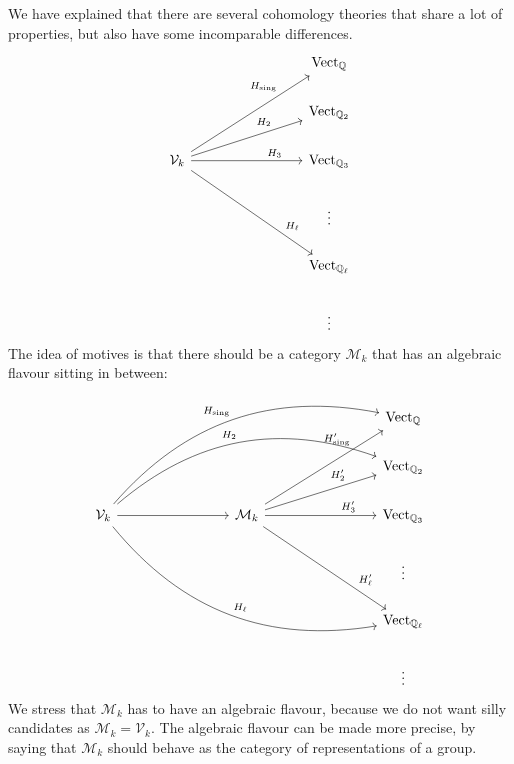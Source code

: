 \documentclass[a4paper,10pt]{article}
\begin{document}
We have explained that there are several cohomology theories that share a lot
of properties, but also have some incomparable differences.
\[
	\begin{tikzcd}[column sep=8em] %
		\null & \mathrm{Vect}_{\mathbb{Q}} \\
		& \mathrm{Vect}_{\mathbb{Q}_{2}} \\
		\mathcal{V}_{k}
		\ar{uur}[near end]{H_{\mathrm{sing}}}
		\ar{ur}[near end]{H_{2}}
		\ar{r}[near end]{H_{3}}
		\ar{ddr}[near end]{H_{\ell}}
		& \mathrm{Vect}_{\mathbb{Q}_{3}} \\
		& \vdots \\
		& \mathrm{Vect}_{\mathbb{Q}_{\ell}} \\
		& \vdots
	\end{tikzcd} %
\]
The idea of motives is that there should be a category $\mathcal{M}_{k}$ that
has an algebraic flavour sitting in between:
\[
	\begin{tikzcd}[column sep=8em] %
		\null && \mathrm{Vect}_{\mathbb{Q}} \\
		&& \mathrm{Vect}_{\mathbb{Q}_{2}} \\
		\mathcal{V}_{k} \rar{}
		\ar[bend left]{uurr}{H_{\mathrm{sing}}}
		\ar[bend left]{urr}{H_{2}}
		\ar[bend right]{ddrr}{H_{\ell}}
		& \mathcal{M}_{k}
		\ar{uur}[near end]{H'_{\mathrm{sing}}}
		\ar{ur}[near end]{H'_{2}}
		\ar{r}[near end]{H'_{3}}
		\ar{ddr}[near end]{H'_{\ell}}
		& \mathrm{Vect}_{\mathbb{Q}_{3}} \\
		&& \vdots \\
		&& \mathrm{Vect}_{\mathbb{Q}_{\ell}} \\
		&& \vdots
	\end{tikzcd} %
\]
We stress that $\mathcal{M}_{k}$ has to have an algebraic flavour, because we
do not want silly candidates as $\mathcal{M}_{k} = \mathcal{V}_{k}$. The
algebraic flavour can be made more precise, by saying that $\mathcal{M}_{k}$
should behave as the category of representations of a group.



\end{document}
